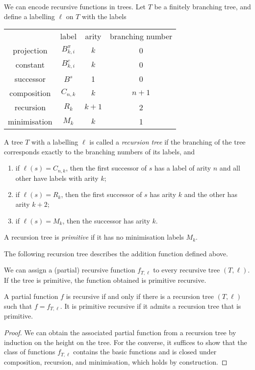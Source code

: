 We can encode recursive functions in trees.
Let \( T \) be a finitely branching tree, and define a labelling \( \ell \) on \( T \) with the labels
\begin{center}
	\begin{tabular}{c c c c}
		& label & arity & branching number \\
		projection & \( B_{k,i}^\pi \) & \( k \) & 0 \\
		constant & \( B_{k,i}^c \) & \( k \) & 0 \\
		successor & \( B^s \) & 1 & 0 \\
		composition & \( C_{n,k} \) & \( k \) & \( n + 1 \) \\
		recursion & \( R_k \) & \( k + 1 \) & 2 \\
		minimisation & \( M_k \) & \( k \) & 1
	\end{tabular}
\end{center}
\begin{definition}
	A tree \( T \) with a labelling \( \ell \) is called a \emph{recursion tree} if the branching of the tree corresponds exactly to the branching numbers of its labels, and
	\begin{enumerate}
		\item if \( \ell(s) = C_{n,k} \), then the first successor of \( s \) has a label of arity \( n \) and all other have labels with arity \( k \);
		\item if \( \ell(s) = R_k \), then the first successor of \( s \) has arity \( k \) and the other has arity \( k + 2 \);
		\item if \( \ell(s) = M_k \), then the successor has arity \( k \).
	\end{enumerate}
	A recursion tree is \emph{primitive} if it has no minimisation labels \( M_k \).
\end{definition}
The following recursion tree describes the addition function defined above.
\begin{center}
\end{center}
We can assign a (partial) recursive function \( f_{T,\ell} \) to every recursive tree \( (T, \ell) \).
If the tree is primitive, the function obtained is primitive recursive.
\begin{theorem}
	A partial function \( f \) is recursive if and only if there is a recursion tree \( (T, \ell) \) such that \( f = f_{T, \ell} \).
	It is primitive recursive if it admits a recursion tree that is primitive.
\end{theorem}
\begin{proof}
	We can obtain the associated partial function from a recursion tree by induction on the height on the tree.
	For the converse, it suffices to show that the class of functions \( f_{T,\ell} \) contains the basic functions and is closed under composition, recursion, and minimisation, which holds by construction.
\end{proof}

